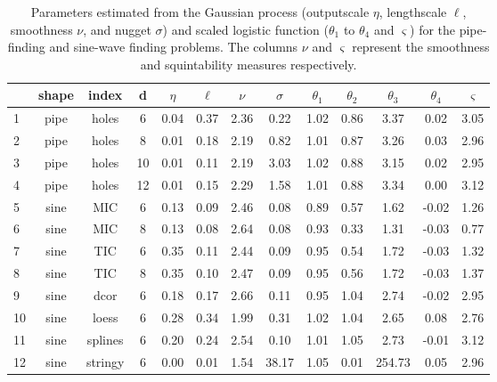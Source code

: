 \documentclass[
  12pt,
]{interact}
\theoremstyle{plain}
\begin{document}
\hypertarget{tbl-smoothness-squintability}{}
\begin{table}
\caption{\label{tbl-smoothness-squintability}Parameters estimated from the Gaussian process (outputscale \(\eta\),
lengthscale \(\ell\), smoothness \(\nu\), and nugget \(\sigma\)) and
scaled logistic function (\(\theta_1\) to \(\theta_4\) and
\(\varsigma\)) for the pipe-finding and sine-wave finding problems. The
columns \(\nu\) and \(\varsigma\) represent the smoothness and
squintability measures respectively. }\tabularnewline

\centering\begingroup\fontsize{10}{12}\selectfont

\begin{tabular}{|>{}lcc>{}c|ccc>{}c|cccc>{}c|}
\toprule
  & shape & index & d & $\eta$ & $\ell$ & $\nu$ & $\sigma$ & $\theta_1$ & $\theta_2$ & $\theta_3$ & $\theta_4$ & $\varsigma$\\
\midrule
1 & pipe & holes & 6 & 0.04 & 0.37 & 2.36 & 0.22 & 1.02 & 0.86 & 3.37 & 0.02 & 3.05\\
2 & pipe & holes & 8 & 0.01 & 0.18 & 2.19 & 0.82 & 1.01 & 0.87 & 3.26 & 0.03 & 2.96\\
3 & pipe & holes & 10 & 0.01 & 0.11 & 2.19 & 3.03 & 1.02 & 0.88 & 3.15 & 0.02 & 2.95\\
4 & pipe & holes & 12 & 0.01 & 0.15 & 2.29 & 1.58 & 1.01 & 0.88 & 3.34 & 0.00 & 3.12\\
5 & sine & MIC & 6 & 0.13 & 0.09 & 2.46 & 0.08 & 0.89 & 0.57 & 1.62 & -0.02 & 1.26\\
6 & sine & MIC & 8 & 0.13 & 0.08 & 2.64 & 0.08 & 0.93 & 0.33 & 1.31 & -0.03 & 0.77\\
7 & sine & TIC & 6 & 0.35 & 0.11 & 2.44 & 0.09 & 0.95 & 0.54 & 1.72 & -0.03 & 1.32\\
8 & sine & TIC & 8 & 0.35 & 0.10 & 2.47 & 0.09 & 0.95 & 0.56 & 1.72 & -0.03 & 1.37\\
9 & sine & dcor & 6 & 0.18 & 0.17 & 2.66 & 0.11 & 0.95 & 1.04 & 2.74 & -0.02 & 2.95\\
10 & sine & loess & 6 & 0.28 & 0.34 & 1.99 & 0.31 & 1.02 & 1.04 & 2.65 & 0.08 & 2.76\\
11 & sine & splines & 6 & 0.20 & 0.24 & 2.54 & 0.10 & 1.01 & 1.05 & 2.73 & -0.01 & 3.12\\
12 & sine & stringy & 6 & 0.00 & 0.01 & 1.54 & 38.17 & 1.05 & 0.01 & 254.73 & 0.05 & 2.96\\
\bottomrule
\end{tabular}
\endgroup{}
\end{table}
\end{document}
